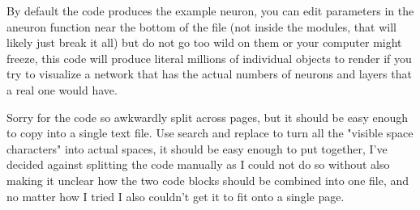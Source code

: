 \documentclass[a4paper]{article}
\begin{document}
    \medskip
    
    By default the code produces the example neuron, you can edit parameters in the aneuron function near the bottom of the file (not inside the modules, that will likely just break it all) but do not go too wild on them or your computer might freeze, this code will produce literal millions of individual objects to render if you try to visualize a network that has the actual numbers of neurons and layers that a real one would have.
    
    \medskip
    
    Sorry for the code so awkwardly split across pages, but it should be easy enough to copy into a single text file. Use search and replace to turn all the "visible space characters" into actual spaces, it should be easy enough to put together, I've decided against splitting the code manually as I could not do so without also making it unclear how the two code blocks should be combined into one file, and no matter how I tried I also couldn't get it to fit onto a single page.
    
\end{document}

